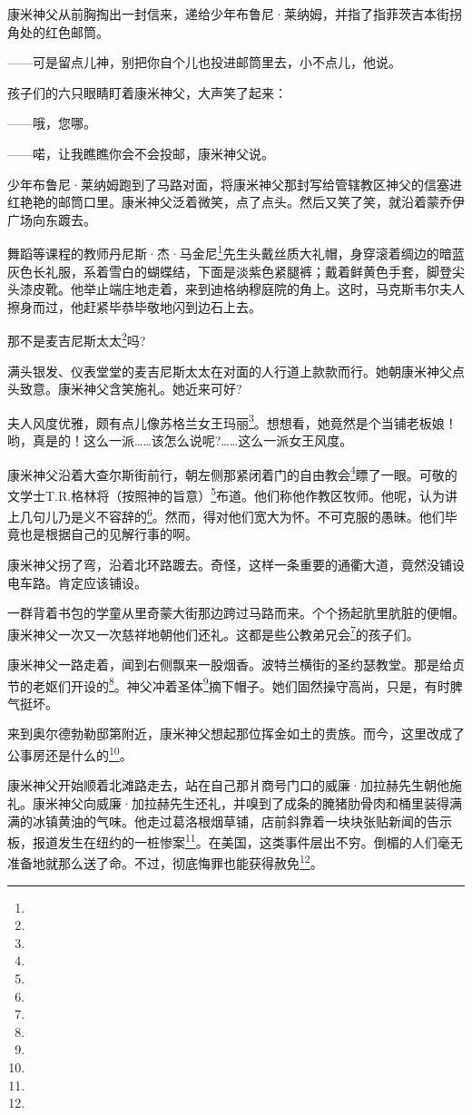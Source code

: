 \par 康米神父从前胸掏出一封信来，递给少年布鲁尼·莱纳姆，并指了指菲茨吉本街拐角处的红色邮筒。
\par ——可是留点儿神，别把你自个儿也投进邮筒里去，小不点儿，他说。
\par 孩子们的六只眼睛盯着康米神父，大声笑了起来：
\par ——哦，您哪。
\par ——喏，让我瞧瞧你会不会投邮，康米神父说。
\par 少年布鲁尼·莱纳姆跑到了马路对面，将康米神父那封写给管辖教区神父的信塞进红艳艳的邮筒口里。康米神父泛着微笑，点了点头。然后又笑了笑，就沿着蒙乔伊广场向东踱去。
\par 舞蹈等课程的教师丹尼斯·杰·马金尼\footnote{}先生头戴丝质大礼帽，身穿滚着绸边的暗蓝灰色长礼服，系着雪白的蝴蝶结，下面是淡紫色紧腿裤；戴着鲜黄色手套，脚登尖头漆皮靴。他举止端庄地走着，来到迪格纳穆庭院的角上。这时，马克斯韦尔夫人擦身而过，他赶紧毕恭毕敬地闪到边石上去。
\par 那不是麦吉尼斯太太\footnote{}吗?
\par 满头银发、仪表堂堂的麦吉尼斯太太在对面的人行道上款款而行。她朝康米神父点头致意。康米神父含笑施礼。她近来可好?
\par 夫人风度优雅，颇有点儿像苏格兰女王玛丽\footnote{}。想想看，她竟然是个当铺老板娘！哟，真是的！这么一派……该怎么说呢?……这么一派女王风度。
\par 康米神父沿着大查尔斯街前行，朝左侧那紧闭着门的自由教会\footnote{}瞟了一眼。可敬的文学士T.R.格林将（按照神的旨意）\footnote{}布道。他们称他作教区牧师。他呢，认为讲上几句儿乃是义不容辞的\footnote{}。然而，得对他们宽大为怀。不可克服的愚昧。他们毕竟也是根据自己的见解行事的啊。
\par 康米神父拐了弯，沿着北环路踱去。奇怪，这样一条重要的通衢大道，竟然没铺设电车路。肯定应该铺设。
\par 一群背着书包的学童从里奇蒙大街那边跨过马路而来。个个扬起肮里肮脏的便帽。康米神父一次又一次慈祥地朝他们还礼。这都是些公教弟兄会\footnote{}的孩子们。
\par 康米神父一路走着，闻到右侧飘来一股烟香。波特兰横街的圣约瑟教堂。那是给贞节的老妪们开设的\footnote{}。神父冲着圣体\footnote{}摘下帽子。她们固然操守高尚，只是，有时脾气挺坏。
\par 来到奥尔德勃勒邸第附近，康米神父想起那位挥金如土的贵族。而今，这里改成了公事房还是什么的\footnote{}。
\par 康米神父开始顺着北滩路走去，站在自己那爿商号门口的威廉·加拉赫先生朝他施礼。康米神父向威廉·加拉赫先生还礼，并嗅到了成条的腌猪肋骨肉和桶里装得满满的冰镇黄油的气味。他走过葛洛根烟草铺，店前斜靠着一块块张贴新闻的告示板，报道发生在纽约的一桩惨案\footnote{}。在美国，这类事件层出不穷。倒楣的人们毫无准备地就那么送了命。不过，彻底悔罪也能获得赦免\footnote{}。
